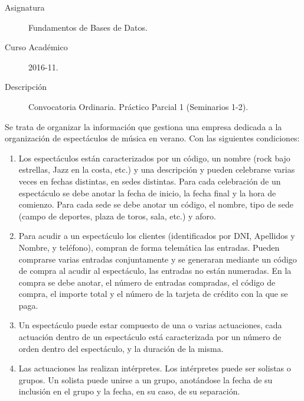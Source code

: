 \documentclass[12pt]{article}
\begin{document}

    
    

    \begin{description}
        \item[Asignatura] Fundamentos de Bases de Datos.
        \item[Curso Académico] 2016-11.
        \item[Descripción] Convocatoria Ordinaria. Práctico Parcial 1 (Seminarios 1-2).
    
    \end{description}
    \newpage

Se trata de organizar la información que gestiona una empresa dedicada a la organización de espectáculos de música en verano. Con las siguientes condiciones:
\begin{enumerate}
    \item Los espectáculos están caracterizados por un código, un nombre (rock bajo estrellas, Jazz en la costa, etc.) y una descripción y pueden celebrarse varias veces en fechas distintas, en sedes distintas. Para cada celebración de un espectáculo se debe anotar la fecha de inicio, la fecha final y la hora de comienzo. Para cada sede se debe anotar un código, el nombre, tipo de sede (campo de deportes, plaza de toros, sala, etc.) y aforo.
    \item Para acudir a un espectáculo los clientes (identificados por DNI, Apellidos y Nombre, y teléfono), compran de forma telemática las entradas. Pueden comprarse varias entradas conjuntamente y se generaran mediante un código de compra al acudir al espectáculo, las entradas no están numeradas. En la compra se debe anotar, el número de entradas compradas, el código de compra, el importe total y el número de la tarjeta de crédito con la que se paga.
    \item Un espectáculo puede estar compuesto de una o varias actuaciones, cada actuación dentro de un espectáculo está caracterizada por un número de orden dentro del espectáculo, y la duración de la misma.
    \item Las actuaciones las realizan intérpretes. Los intérpretes puede ser solistas o grupos. Un solista puede unirse a un grupo, anotándose la fecha de su inclusión en el grupo y la fecha, en su caso, de su separación.
\end{enumerate}
\end{document}
